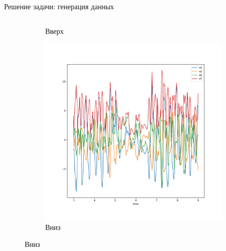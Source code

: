 \documentclass{beamer}
\begin{document}
\begin{frame}{Решение задачи: генерация данных}
\begin{columns}
\begin{column}{.6\textwidth}
\begin{figure}
\begin{subfigure}[b]{0.4\textwidth}
                    \caption{Вверх}
                \end{subfigure}%
                \begin{subfigure}[b]{0.4\textwidth}
                    \centering
                    \includegraphics[width=\linewidth]{../pics/raw_go_down.png}
                    \caption{Вниз}
                \end{subfigure}

            \end{figure}
        \end{column}%
    \end{columns}
\end{frame}

\end{document}
